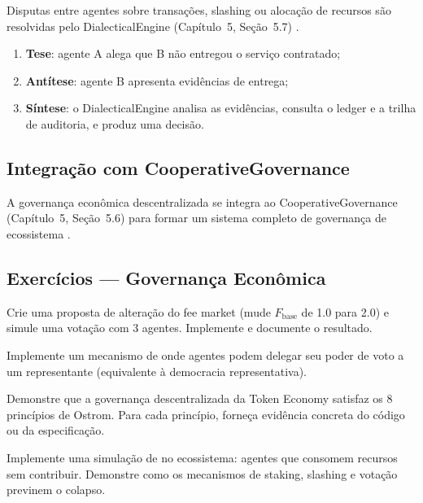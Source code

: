 Disputas entre agentes sobre transações, slashing ou alocação de
recursos são resolvidas pelo DialecticalEngine (Capítulo~5,
Seção~5.7) \cite{opencode2026spec036, opencode2026ecosystem}.

\begin{enumerate}
\item \textbf{Tese}: agente A alega que B não entregou o serviço
contratado;
\item \textbf{Antítese}: agente B apresenta evidências de entrega;
\item \textbf{Síntese}: o DialecticalEngine analisa as evidências,
consulta o ledger e a trilha de auditoria, e produz uma decisão.
\end{enumerate}

\subsection{Integração com CooperativeGovernance}

A governança econômica descentralizada se integra ao
CooperativeGovernance (Capítulo~5, Seção~5.6) para formar um
sistema completo de governança de ecossistema
\cite{opencode2026spec036, ostrom1990governing}.

\subsection{Exercícios — Governança Econômica}

\begin{exercicio}
Crie uma proposta de alteração do fee market (mude $F_{\text{base}}$
de 1.0 para 2.0) e simule uma votação com 3 agentes. Implemente
e documente o resultado.
\end{exercicio}

\begin{exercicio}
Implemente um mecanismo de  onde
agentes podem delegar seu poder de voto a um representante
(equivalente à democracia representativa).
\end{exercicio}

\begin{exercicio}
Demonstre que a governança descentralizada da Token Economy
satisfaz os 8 princípios de Ostrom. Para cada princípio, forneça
evidência concreta do código ou da especificação.
\end{exercicio}

\begin{exercicio}
Implemente uma simulação de  no
ecossistema: agentes que consomem recursos sem contribuir.
Demonstre como os mecanismos de staking, slashing e votação
previnem o colapso.
\end{exercicio}

